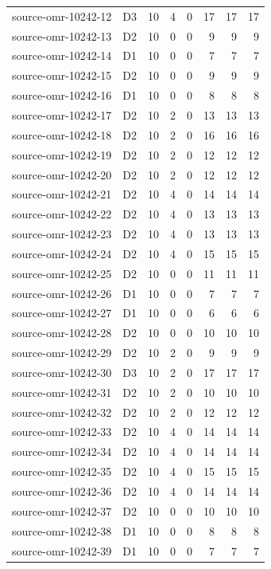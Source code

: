 \begin{longtable}{llrrrrrr}
source-omr-10242-12 & D3 & 10 & 4 & 0 & 17 & 17 & 17\\
source-omr-10242-13 & D2 & 10 & 0 & 0 & 9 & 9 & 9\\
source-omr-10242-14 & D1 & 10 & 0 & 0 & 7 & 7 & 7\\
source-omr-10242-15 & D2 & 10 & 0 & 0 & 9 & 9 & 9\\
source-omr-10242-16 & D1 & 10 & 0 & 0 & 8 & 8 & 8\\
source-omr-10242-17 & D2 & 10 & 2 & 0 & 13 & 13 & 13\\
source-omr-10242-18 & D2 & 10 & 2 & 0 & 16 & 16 & 16\\
source-omr-10242-19 & D2 & 10 & 2 & 0 & 12 & 12 & 12\\
source-omr-10242-20 & D2 & 10 & 2 & 0 & 12 & 12 & 12\\
source-omr-10242-21 & D2 & 10 & 4 & 0 & 14 & 14 & 14\\
source-omr-10242-22 & D2 & 10 & 4 & 0 & 13 & 13 & 13\\
source-omr-10242-23 & D2 & 10 & 4 & 0 & 13 & 13 & 13\\
source-omr-10242-24 & D2 & 10 & 4 & 0 & 15 & 15 & 15\\
source-omr-10242-25 & D2 & 10 & 0 & 0 & 11 & 11 & 11\\
source-omr-10242-26 & D1 & 10 & 0 & 0 & 7 & 7 & 7\\
source-omr-10242-27 & D1 & 10 & 0 & 0 & 6 & 6 & 6\\
source-omr-10242-28 & D2 & 10 & 0 & 0 & 10 & 10 & 10\\
source-omr-10242-29 & D2 & 10 & 2 & 0 & 9 & 9 & 9\\
source-omr-10242-30 & D3 & 10 & 2 & 0 & 17 & 17 & 17\\
source-omr-10242-31 & D2 & 10 & 2 & 0 & 10 & 10 & 10\\
source-omr-10242-32 & D2 & 10 & 2 & 0 & 12 & 12 & 12\\
source-omr-10242-33 & D2 & 10 & 4 & 0 & 14 & 14 & 14\\
source-omr-10242-34 & D2 & 10 & 4 & 0 & 14 & 14 & 14\\
source-omr-10242-35 & D2 & 10 & 4 & 0 & 15 & 15 & 15\\
source-omr-10242-36 & D2 & 10 & 4 & 0 & 14 & 14 & 14\\
source-omr-10242-37 & D2 & 10 & 0 & 0 & 10 & 10 & 10\\
source-omr-10242-38 & D1 & 10 & 0 & 0 & 8 & 8 & 8\\
source-omr-10242-39 & D1 & 10 & 0 & 0 & 7 & 7 & 7\\

\end{longtable}

